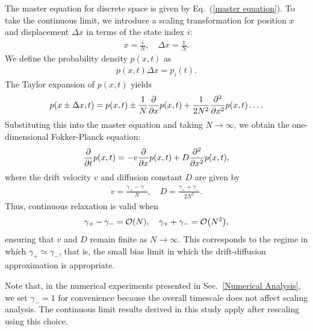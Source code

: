 \documentclass[%
 reprint,
superscriptaddress,
 amsmath,amssymb,
 aps,
 prx,
]{revtex4-2}
\begin{document}
The master equation for discrete space is given by Eq.~(\ref{master equation}). 
To take the continuous limit, we introduce a scaling transformation for position $x$ and displacement $\Delta x$ in terms of the state index $i$: 
\begin{gather}
    x = \frac{i}{N}, \quad  \Delta x = \frac{1}{N}.
\end{gather}
We define the probability density $p(x,t)$ as  
\begin{align}
     p(x,t) \Delta x = p_i(t).
\end{align} 
The Taylor expansion of $p(x,t)$ yields 
\begin{gather}
    p(x\pm \Delta x,t) = p(x,t) \pm \frac{1}{N} \pdv{x}p(x,t) + \frac{1}{2N^2} \pdv[2]{x}p(x,t) \dots. 
\end{gather}
Substituting this into the master equation and taking $N\to\infty$, we obtain the one-dimensional Fokker-Planck equation: 
\begin{align}
     \pdv{t} p(x,t) = - v\pdv{x} p(x,t) + D \pdv[2]{x} p(x,t), 
     \label{eqn:FP}
\end{align}
where the drift velocity $v$ and diffusion constant $D$ are given by 
\begin{gather}
v  = \frac{\gamma_+ - \gamma_-}{N},  \quad  D = \frac{\gamma_+ + \gamma_-}{2N^2}.  
\end{gather}
Thus, continuous relaxation is valid when
\begin{align}
     \gamma_+ - \gamma_-=\order{N}, \quad \gamma_+ + \gamma_-=\order{N^2}, 
\end{align}
ensuring that $v$ and $D$ remain finite as $N\to\infty$. 
This corresponds to the regime in which $\gamma_+\simeq\gamma_-$, that is, the small bias limit in which the drift-diffusion approximation is appropriate. 

Note that, in the numerical experiments presented in Sec.~\ref{Numerical Analysis}, we set $\gamma_-=1$ for convenience because the overall timescale does not affect scaling analysis. The continuous limit results derived in this study apply after rescaling using this choice. 
\end{document}
